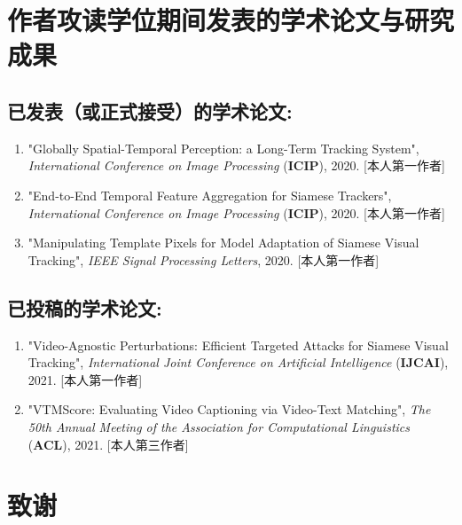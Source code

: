 \chapter{作者攻读学位期间发表的学术论文与研究成果}


\section*{已发表（或正式接受）的学术论文:}

{
\setlist[enumerate]{}%
\begin{enumerate}[nosep]
    \item "Globally Spatial-Temporal Perception: a Long-Term Tracking System", \textit{International Conference on Image Processing} (\textbf{ICIP}), 2020. [本人第一作者]
    \item "End-to-End Temporal Feature Aggregation for Siamese Trackers", \textit{International Conference on Image Processing} (\textbf{ICIP}), 2020. [本人第一作者]
    \item "Manipulating Template Pixels for Model Adaptation of Siamese Visual Tracking", \textit{IEEE Signal Processing Letters}, 2020. [本人第一作者]
\end{enumerate}
}

\section*{已投稿的学术论文:}

{
\setlist[enumerate]{}%
\begin{enumerate}[nosep]
    \item "Video-Agnostic Perturbations: Efficient Targeted Attacks for Siamese Visual Tracking", \textit{International Joint Conference on Artificial Intelligence} (\textbf{IJCAI}), 2021. [本人第一作者]
    \item "VTMScore: Evaluating Video Captioning via Video-Text Matching", \textit{The 50th Annual Meeting of the Association for Computational Linguistics} (\textbf{ACL}), 2021. [本人第三作者]
\end{enumerate}
}

\chapter[致谢]{致\quad 谢}%
\thispagestyle{noheaderstyle}%

\cleardoublepage[plain]%
